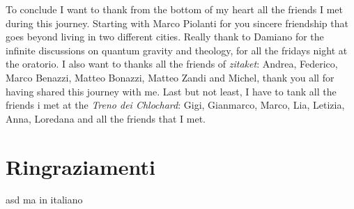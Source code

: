 To conclude I want to thank from the bottom of my heart all the friends I met during this journey. Starting with Marco Piolanti for you sincere friendship that goes beyond living in two different cities. Really thank to Damiano for the infinite discussions on quantum gravity and theology, for all the fridays night at the oratorio. I also want to thanks all the friends of \emph{zitaket}: Andrea, Federico, Marco Benazzi, Matteo Bonazzi, Matteo Zandi and Michel, thank you all for having shared this journey with me. Last but not least, I have to tank all the friends i met at the \emph{Treno dei Chlochard}: Gigi, Gianmarco, Marco, Lia, Letizia, Anna, Loredana and all the friends that I met.



\newpage
\section*{Ringraziamenti}
asd ma in italiano